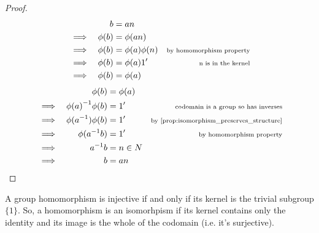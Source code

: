 \documentclass[MathsNotesBase.tex]{subfiles}
\begin{document}
{		
		\begin{proof}
			\begin{align*}
				&& b &= an  \\
				&\implies & \phi(b) &= \phi(an) \\
				&\implies & \phi(b) &= \phi(a)\phi(n) &\text{\scriptsize{by homomorphism property}} \\
				&\implies & \phi(b) &= \phi(a)1' &\text{\scriptsize{n is in the kernel}} \\
				&\implies & \phi(b) &= \phi(a) \\
			\end{align*}
			\begin{align*}
				&& \phi(b) &= \phi(a) \\
				&\implies & \inv{\phi(a)}\phi(b) &= 1'  &\sidecomment{codomain is a group so has inverses} \\
				&\implies & \phi(\inv{a})\phi(b) &= 1' &\sidecomment{by \autoref{prop:isomorphism_preserves_structure}} \\
				&\implies & \phi(\inv{a}b) &= 1' &\sidecomment{by homomorphism property} \\
				&\implies & \inv{a}b &= n \in N \\
				&\implies & b &= an \\
			\end{align*}
		\end{proof}
	
		\begin{corollary}
			A group homomorphism is injective if and only if its kernel is the trivial subgroup $\{1\}$. So, a homomorphism is an isomorhpism if its kernel contains only the identity and its image is the whole of the codomain (i.e. it's surjective). 
		\end{corollary}
	}
\end{document}
